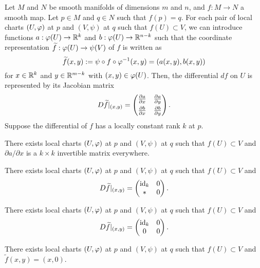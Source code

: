 \documentclass{../note}
\begin{document}
\begin{prb}
Let $M$ and $N$ be smooth manifolds of dimensions $m$ and $n$, and $f:M\to N$ a smooth map.
Let $p\in M$ and $q\in N$ such that $f(p)=q$.
For each pair of local charts $(U,\varphi)$ at $p$ and $(V,\psi)$ at $q$ such that $f(U)\subset V$, we can introduce functions $a:\varphi(U)\to\mathbb{R}^k$ and $b:\varphi(U)\to\mathbb{R}^{n-k}$ such that the coordinate representation $\widetilde f:\varphi(U)\to\psi(V)$ of $f$ is written as
\[\widetilde f(x,y):=\psi\circ f\circ\varphi^{-1}(x,y)=(a(x,y),b(x,y))\]
for $x\in\mathbb{R}^k$ and $y\in\mathbb{R}^{m-k}$ with $(x,y)\in\varphi(U)$.
Then, the differential $df$ on $U$ is represented by its Jacobian matrix
\[
D\tilde f|_{(x,y)}=\mat{\pd{a}{x}&\pd{a}{y}\\[4pt]\pd{b}{x}&\pd{b}{y}}.\]
Suppose the differential of $f$ has a locally constant rank $k$ at $p$.
\begin{parts}
\item There exists local charts $(U,\varphi)$ at $p$ and $(V,\psi)$ at $q$ such that $f(U)\subset V$ and $\partial a/\partial x$ is a $k\times k$ invertible matrix everywhere.
\item There exists local charts $(U,\varphi)$ at $p$ and $(V,\psi)$ at $q$ such that $f(U)\subset V$ and
\[D\widetilde f|_{(x,y)}=\begin{pmatrix}\operatorname{id}_k&0\\\ast&0\end{pmatrix}.\]
\item There exists local charts $(U,\varphi)$ at $p$ and $(V,\psi)$ at $q$ such that $f(U)\subset V$ and
\[D\widetilde f|_{(x,y)}=\begin{pmatrix}\operatorname{id}_k&0\\0&0\end{pmatrix}.\]
\item There exists local charts $(U,\varphi)$ at $p$ and $(V,\psi)$ at $q$ such that $f(U)\subset V$ and $\tilde f(x,y)=(x,0)$.
\end{parts}
\end{prb}
\end{document}
